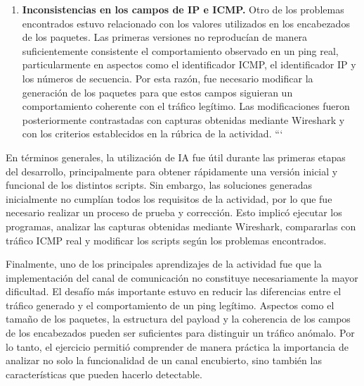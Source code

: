 \documentclass[letter,12pt]{article}
\begin{document}
\begin{enumerate}
\item \textbf{Inconsistencias en los campos de IP e ICMP.} Otro de los problemas encontrados estuvo relacionado con los valores utilizados en los encabezados de los paquetes. Las primeras versiones no reproducían de manera suficientemente consistente el comportamiento observado en un ping real, particularmente en aspectos como el identificador ICMP, el identificador IP y los números de secuencia. Por esta razón, fue necesario modificar la generación de los paquetes para que estos campos siguieran un comportamiento coherente con el tráfico legítimo. Las modificaciones fueron posteriormente contrastadas con capturas obtenidas mediante Wireshark y con los criterios establecidos en la rúbrica de la actividad.
```

\end{enumerate}

En términos generales, la utilización de IA fue útil durante las primeras etapas del desarrollo, principalmente para obtener rápidamente una versión inicial y funcional de los distintos scripts. Sin embargo, las soluciones generadas inicialmente no cumplían todos los requisitos de la actividad, por lo que fue necesario realizar un proceso de prueba y corrección. Esto implicó ejecutar los programas, analizar las capturas obtenidas mediante Wireshark, compararlas con tráfico ICMP real y modificar los scripts según los problemas encontrados.

Finalmente, uno de los principales aprendizajes de la actividad fue que la implementación del canal de comunicación no constituye necesariamente la mayor dificultad. El desafío más importante estuvo en reducir las diferencias entre el tráfico generado y el comportamiento de un ping legítimo. Aspectos como el tamaño de los paquetes, la estructura del payload y la coherencia de los campos de los encabezados pueden ser suficientes para distinguir un tráfico anómalo. Por lo tanto, el ejercicio permitió comprender de manera práctica la importancia de analizar no solo la funcionalidad de un canal encubierto, sino también las características que pueden hacerlo detectable.
\end{document}
